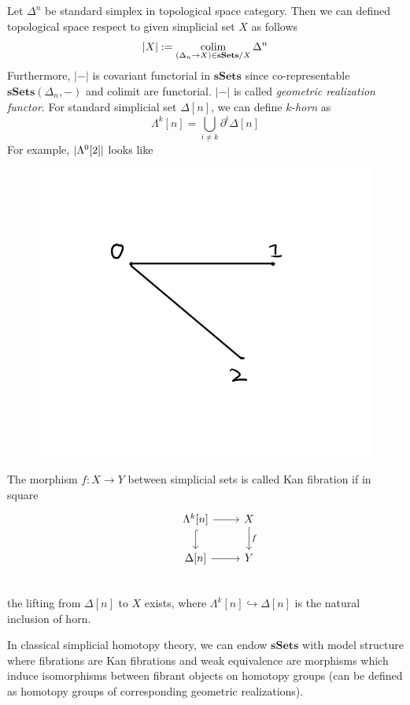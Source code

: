 \documentclass[b5paper,10pt]{article}
\DeclarePairedDelimiter{\abs}{\lvert}{\rvert}
\begin{document}
Let $\Delta^n$ be standard simplex in topological space category. Then we can defined topological space respect to given simplicial set $X$ as follows
\[
|X| := \operatorname*{colim}_{(\Delta_n \to X) \in \mathbf{sSets}/X} \Delta^n
\]
Furthermore, $|-|$ is covariant functorial in $\mathbf{sSets}$ since co-representable $\mathbf{sSets}(\Delta_n,-)$ and colimit are functorial. $|-|$ is called \emph{geometric realization functor}.
For standard simplicial set $\Delta[n]$, we can define $k$-\emph{horn} as
\[
\Lambda^k[n] = \bigcup_{i \neq k} \partial^i \Delta[n]
\]
For example, $\abs{\Lambda^0[2]}$ looks like
\begin{figure}[h]
	\centering\includegraphics[height=0.15\textheight ]{PIC/horn.png}
\end{figure}
\begin{secdefn}
	The morphism $f \colon X \to Y$ between simplicial sets is called Kan fibration if in square
	\[
	\begin{tikzcd}
	&\Lambda^k[n] \ar[r] \ar[d,hook]& X \ar[d,"f"]\\
	& \Delta[n] \ar[r] & Y \\
	\end{tikzcd}
	\]
	the lifting from $\Delta[n]$ to $X$ exists, where $\Lambda^k[n] \hookrightarrow \Delta[n]$ is the natural inclusion of horn.
\end{secdefn}
In classical simplicial homotopy theory, we can endow $\mathbf{sSets}$ with model structure where fibrations are Kan fibrations and weak equivalence are morphisms which induce isomorphisms between fibrant objects on homotopy groups (can be defined as homotopy groups of corresponding geometric realizations).
\end{document}
